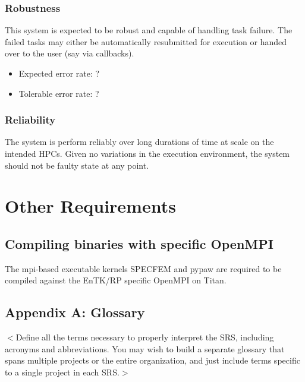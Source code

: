 \documentclass{scrreprt}
\begin{document}
\subsection{Robustness}

This system is expected to be robust and capable of handling task failure. The failed tasks may either be automatically resubmitted for execution or handed over to the user (say via callbacks). 

\begin{itemize}[noitemsep]
\item Expected error rate: ?
\item Tolerable error rate: ?
\end{itemize}

\subsection{Reliability}

The system is perform reliably over long durations of time at scale on the intended HPCs. Given no variations in the execution environment, the system should not be faulty state at any point.

\chapter{Other Requirements}

\section{Compiling binaries with specific OpenMPI}

The mpi-based executable kernels SPECFEM and pypaw are required to be compiled against the EnTK/RP specific OpenMPI on Titan.

\section{Appendix A: Glossary}
$<$Define all the terms necessary to properly interpret the SRS, including 
acronyms and abbreviations. You may wish to build a separate glossary that spans 
multiple projects or the entire organization, and just include terms specific to 
a single project in each SRS.$>$
\end{document}
